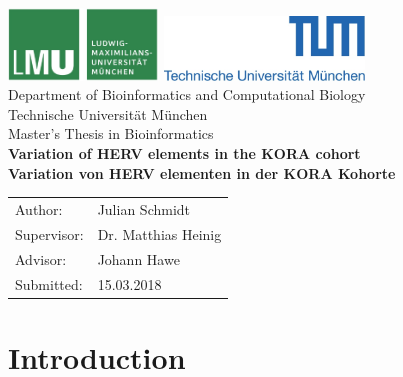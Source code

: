 \documentclass[a4paper,12pt]{article}
\begin{document}
\begin{titlepage}
{\sffamily


\begin{center}
\includegraphics[width=0.3\textwidth]{../figures/LMU-logo.jpg}
\hfill
\includegraphics[width=0.4\textwidth]{../figures/TUM-logo.jpg}  
\\[1.5cm]  

{\LARGE Department of Bioinformatics and Computational Biology}\\[0.5cm]
{Technische Universit\"at M\"unchen}\\[1cm]

{\Large Master's Thesis in Bioinformatics}\\[2cm]
{\textbf{\LARGE Variation of HERV elements in the KORA cohort}}\\[2cm]
{\textbf{\LARGE Variation von HERV elementen in der KORA Kohorte}}\\[4cm]

\end{center}
\begin{center}\Large
  \begin{tabular}{ll}
    Author:& Julian Schmidt\\
    Supervisor: & Dr. Matthias Heinig\\
    Advisor:        & Johann Hawe\\
    Submitted:     &  15.03.2018\\
  \end{tabular}
\end{center}

}%

\end{titlepage}



\tableofcontents
\newpage

\section{Introduction}
\end{document}
